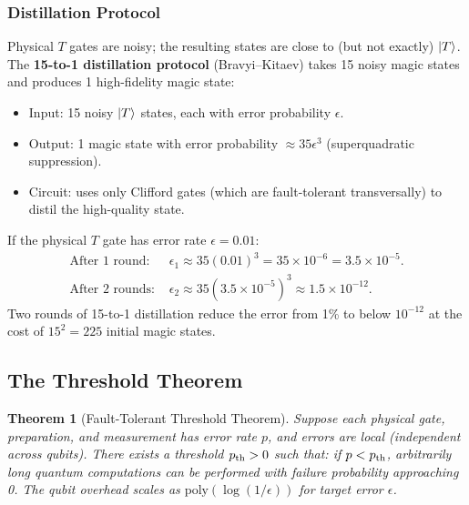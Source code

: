 \documentclass[11pt, a4paper]{article}
\theoremstyle{definition}
\theoremstyle{plain}
\newtheorem{theorem}{Theorem}[section]
\theoremstyle{remark}
\begin{document}
\subsubsection{Distillation Protocol}

Physical $T$ gates are noisy; the resulting states are close to
(but not exactly) $\ket{T}$.  The \textbf{15-to-1 distillation protocol}
(Bravyi--Kitaev) takes 15 noisy magic states and produces 1 high-fidelity
magic state:

\begin{itemize}
  \item Input: 15 noisy $\ket{T}$ states, each with error probability $\epsilon$.
  \item Output: 1 magic state with error probability
        $\approx 35\epsilon^3$ (superquadratic suppression).
  \item Circuit: uses only Clifford gates (which are fault-tolerant
        transversally) to distil the high-quality state.
\end{itemize}

\begin{workedexample}
If the physical $T$ gate has error rate $\epsilon = 0.01$:
\begin{align*}
  \text{After 1 round: } &\epsilon_1 \approx 35(0.01)^3 = 35 \times 10^{-6}
    = 3.5 \times 10^{-5}.\\
  \text{After 2 rounds: } &\epsilon_2 \approx 35(3.5\times10^{-5})^3
    \approx 1.5 \times 10^{-12}.
\end{align*}
Two rounds of 15-to-1 distillation reduce the error from 1\% to below
$10^{-12}$ at the cost of $15^2 = 225$ initial magic states.
\end{workedexample}

\subsection{The Threshold Theorem}
\label{sec:threshold}

\begin{theorem}[Fault-Tolerant Threshold Theorem]
\label{thm:threshold}
Suppose each physical gate, preparation, and measurement has error rate
$p$, and errors are local (independent across qubits).  There exists a
threshold $p_{\rm th} > 0$ such that: if $p < p_{\rm th}$, arbitrarily long
quantum computations can be performed with failure probability approaching 0.
The qubit overhead scales as $\text{poly}(\log(1/\epsilon))$ for target
error $\epsilon$.
\end{theorem}
\end{document}
